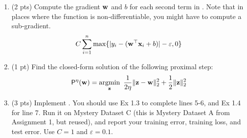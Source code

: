 \documentclass{tron}
\newcommand{\mref}[1]{\underline{\textbf{\hypersetup{linkcolor=orange}\Cref{#1}\hypersetup{linkcolor=blue}}}}
\begin{document}
\begin{exercise}{}
\begin{enumerate}
\begin{algo}{alg:CSVM}
{{				
			
			$\wv \gets $ 
		}
	}
\end{algo}

Note that this differs a bit from what you've seen so far, in terms of gradient descent. Rather than taking steps based on the entire loss function, we instead take a step based on the unregularized loss, and then perform a projection step based on the regularizer.

\item (2 pts) Compute the gradient \wrt $\mathbf{w}$ and $b$ for each second term in .
Note that in places where the function is non-differentiable, you might have to compute a sub-gradient.
\begin{align}
C\sum_{i=1}^n \max\{ | y_i -  (\mathbf{w}^\top \mathbf{x}_i + b)| -\varepsilon , 0 \}
\end{align}
	
	
\ans{\mref{ans:4:2}} 

	
\item (1 pt) Find the closed-form solution of the following proximal step:
	\begin{align}
	\mathsf{P}^\eta(\mathbf{w}) = \mathop{\mathrm{argmin}}_{\mathbf{z}} ~ \frac{1}{2\eta} \|\mathbf{z} - \mathbf{w}\|_2^2 + \frac{1}{2} \|\mathbf{z}\|_2^2
	\end{align}
	
	
\ans{\mref{ans:4:3}} 

	
\item (3 pts) Implement . You should use Ex 1.3 to complete lines 5-6, and Ex 1.4 for line 7. 
Run it on Mystery Dataset C (this is Mystery Dataset A from Assignment 1, but reused), and report your training error, training loss, and test error. Use $C=1$ and $\varepsilon = 0.1$.

\ans{\mref{ans:4:4}} 

\end{enumerate}
\end{exercise}
\end{document}
